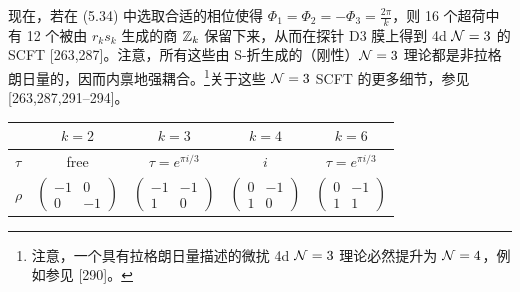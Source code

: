 现在，若在 (5.34) 中选取合适的相位使得 $\Phi_1=\Phi_2=-\Phi_3=\frac{2\pi}{k}$，则 16 个超荷中有 12 个被由 $r_k s_k$ 生成的商 $\mathbb{Z}_k$ 保留下来，从而在探针 D3 膜上得到 4d $\mathcal{N}=3$ 的 SCFT [263,287]。注意，所有这些由 S-折生成的（刚性）$\mathcal{N}=3$ 理论都是非拉格朗日量的，因而内禀地强耦合。\footnote{注意，一个具有拉格朗日量描述的微扰 4d $\mathcal{N}=3$ 理论必然提升为 $\mathcal{N}=4$，例如参见 [290]。}关于这些 $\mathcal{N}=3$ SCFT 的更多细节，参见 [263,287,291--294]。


\begin{center}
\begin{tabular}{lcccc}
\toprule
 & $k=2$ & $k=3$ & $k=4$ & $k=6$ \\
\midrule
$\tau$ & free & $\tau=e^{\pi i/3}$ & $i$ & $\tau=e^{\pi i/3}$ \\[6pt]
$\rho$ & $\begin{pmatrix} -1 & 0 \\ 0 & -1 \end{pmatrix}$
       & $\begin{pmatrix} -1 & -1 \\ 1 & 0 \end{pmatrix}$
       & $\begin{pmatrix} 0 & -1 \\ 1 & 0 \end{pmatrix}$
       & $\begin{pmatrix} 0 & -1 \\ 1 & 1 \end{pmatrix}$ \\
\bottomrule
\end{tabular}
\end{center}


